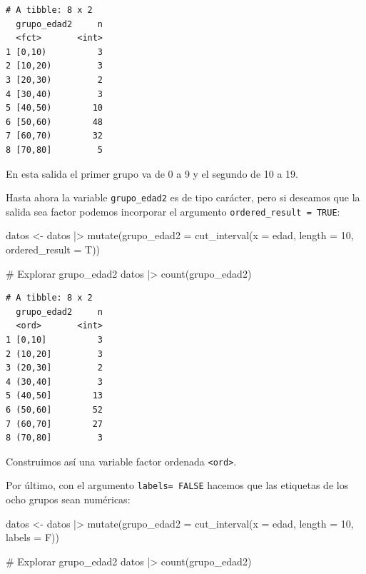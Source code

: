 \documentclass[
  spanish,
  a4paper,
]{scrbook}
\newenvironment{Shaded}{\begin{snugshade}}{\end{snugshade}}
\newcommand{\AttributeTok}[1]{\textcolor[rgb]{0.40,0.45,0.13}{#1}}
\newcommand{\CommentTok}[1]{\textcolor[rgb]{0.37,0.37,0.37}{#1}}
\newcommand{\DecValTok}[1]{\textcolor[rgb]{0.68,0.00,0.00}{#1}}
\newcommand{\FunctionTok}[1]{\textcolor[rgb]{0.28,0.35,0.67}{#1}}
\newcommand{\NormalTok}[1]{\textcolor[rgb]{0.00,0.23,0.31}{#1}}
\newcommand{\OtherTok}[1]{\textcolor[rgb]{0.00,0.23,0.31}{#1}}
\newcommand{\SpecialCharTok}[1]{\textcolor[rgb]{0.37,0.37,0.37}{#1}}
\begin{document}
\begin{verbatim}
# A tibble: 8 x 2
  grupo_edad2     n
  <fct>       <int>
1 [0,10)          3
2 [10,20)         3
3 [20,30)         2
4 [30,40)         3
5 [40,50)        10
6 [50,60)        48
7 [60,70)        32
8 [70,80]         5
\end{verbatim}

En esta salida el primer grupo va de 0 a 9 y el segundo de 10 a 19.

Hasta ahora la variable \texttt{grupo\_edad2} es de tipo carácter, pero
si deseamos que la salida sea factor podemos incorporar el argumento
\texttt{ordered\_result\ =\ TRUE}:

\begin{Shaded}
\begin{Highlighting}[]
\NormalTok{datos }\OtherTok{\textless{}{-}}\NormalTok{ datos }\SpecialCharTok{|\textgreater{}}
  \FunctionTok{mutate}\NormalTok{(}\AttributeTok{grupo\_edad2 =} \FunctionTok{cut\_interval}\NormalTok{(}\AttributeTok{x =}\NormalTok{ edad, }\AttributeTok{length =} \DecValTok{10}\NormalTok{, }\AttributeTok{ordered\_result =}\NormalTok{ T))}

\CommentTok{\# Explorar grupo\_edad2}
\NormalTok{datos }\SpecialCharTok{|\textgreater{}}
  \FunctionTok{count}\NormalTok{(grupo\_edad2)}
\end{Highlighting}
\end{Shaded}

\begin{verbatim}
# A tibble: 8 x 2
  grupo_edad2     n
  <ord>       <int>
1 [0,10]          3
2 (10,20]         3
3 (20,30]         2
4 (30,40]         3
5 (40,50]        13
6 (50,60]        52
7 (60,70]        27
8 (70,80]         3
\end{verbatim}

Construimos así una variable factor ordenada
\texttt{\textless{}ord\textgreater{}}.

Por último, con el argumento \texttt{labels=\ FALSE} hacemos que las
etiquetas de los ocho grupos sean numéricas:

\begin{Shaded}
\begin{Highlighting}[]
\NormalTok{datos }\OtherTok{\textless{}{-}}\NormalTok{ datos }\SpecialCharTok{|\textgreater{}}
  \FunctionTok{mutate}\NormalTok{(}\AttributeTok{grupo\_edad2 =} \FunctionTok{cut\_interval}\NormalTok{(}\AttributeTok{x =}\NormalTok{ edad, }\AttributeTok{length =} \DecValTok{10}\NormalTok{, }\AttributeTok{labels =}\NormalTok{ F))}

\CommentTok{\# Explorar grupo\_edad2}
\NormalTok{datos }\SpecialCharTok{|\textgreater{}}
  \FunctionTok{count}\NormalTok{(grupo\_edad2)}
\end{Highlighting}
\end{Shaded}
\end{document}
